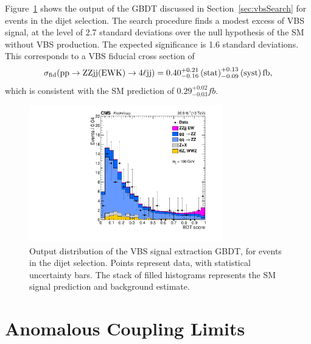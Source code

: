 Figure~\ref{fig:vbsBDT} shows the output of the GBDT discussed in Section~\ref{sec:vbsSearch} for events in the dijet selection.
The search procedure finds a modest excess of VBS signal, at the level of 2.7 standard deviations over the null hypothesis of the SM without VBS {\ZZ} production.
The expected significance is 1.6 standard deviations.
This corresponds to a VBS fiducial cross section of
\begin{equation}
  \sigma_\text{fid}(\mathrm{p}\mathrm{p} \to \mathrm{Z}\mathrm{Z}\mathrm{j}\mathrm{j}\text{(EWK)} \to 4\ell\mathrm{j}\mathrm{j}) = 0.40^{+0.21}_{-0.16} \,\text{(stat)} ^{+0.13}_{-0.09} \,\text{(syst)} \mathrm{\,fb},
\end{equation}
which is consistent with the SM prediction of $0.29^{+0.02}_{-0.03} \unit{fb}$.


\begin{figure}[htbp]
  \begin{center}
    \includegraphics[width=0.75\textwidth]{results/BDT_someVBS.pdf}
    \caption[VBS signal extraction GBDT output]{
        Output distribution of the VBS signal extraction GBDT, for events in the dijet selection.
        Points represent data, with statistical uncertainty bars.
        The stack of filled histograms represents the SM signal prediction and background estimate.
      }\label{fig:vbsBDT}
  \end{center}
\end{figure}



\section{Anomalous Coupling Limits}

